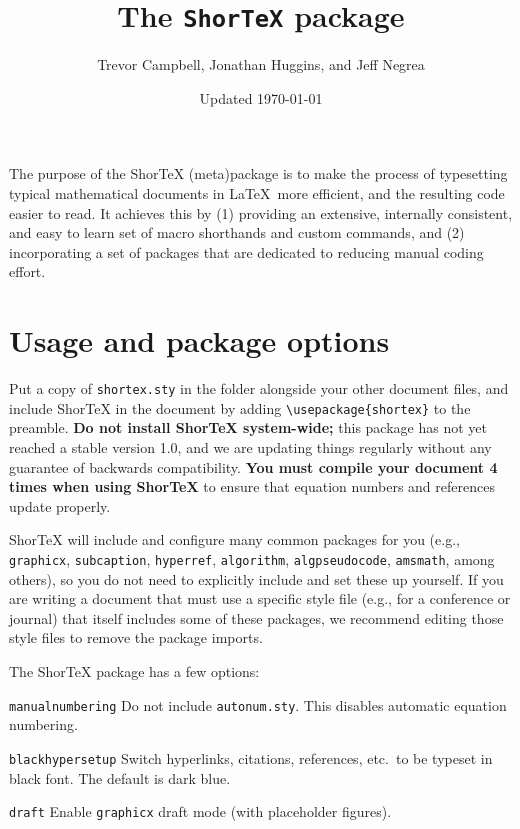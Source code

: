 \documentclass{article}
\title{The \texttt{ShorTeX} package}
\author{Trevor Campbell, Jonathan Huggins, and Jeff Negrea}
\date{Updated \today}
\begin{document}
\maketitle


\babs
The purpose of the ShorTeX (meta)package is to make the process of typesetting
typical mathematical documents in \LaTeX~more efficient, and the resulting
code easier to read.  It achieves this by 
(1) providing an
extensive, internally consistent, and easy to learn set of macro
shorthands and custom commands, and 
(2) incorporating a set of packages that are
dedicated to reducing manual coding effort.
\eabs


\tableofcontents

\section{Usage and package options}\label{sec:usage}

Put a copy of \texttt{shortex.sty} in the folder
alongside your other document files, and
include ShorTeX in the document by adding \verb!\usepackage{shortex}! to the preamble.
\textbf{Do not install ShorTeX system-wide;} this package has not yet reached a stable version 1.0,
and we are updating things regularly without any guarantee of backwards
compatibility. 
\textbf{You must compile your document 4 times when using ShorTeX} to ensure that equation
numbers and references update properly.


ShorTeX will include and configure many common packages for you (e.g., \texttt{graphicx}, \texttt{subcaption}, \texttt{hyperref},
\texttt{algorithm}, \texttt{algpseudocode}, \texttt{amsmath}, among others),
so you do not need to explicitly include and set these up yourself.
If you are writing a document that must use a specific style file (e.g., for a conference or journal) that itself
includes some of these packages, we recommend editing those style files to remove the package imports.

The ShorTeX package has a few options:
\bdesc
\item[\texttt{manualnumbering}] Do not include \texttt{autonum.sty}. This disables automatic equation numbering.
\item[\texttt{blackhypersetup}] Switch hyperlinks, citations, references, etc.~to be typeset in black font. The default is dark blue.
\item[\texttt{draft}] Enable \texttt{graphicx} draft mode (with placeholder figures).
\edesc
\end{document}
